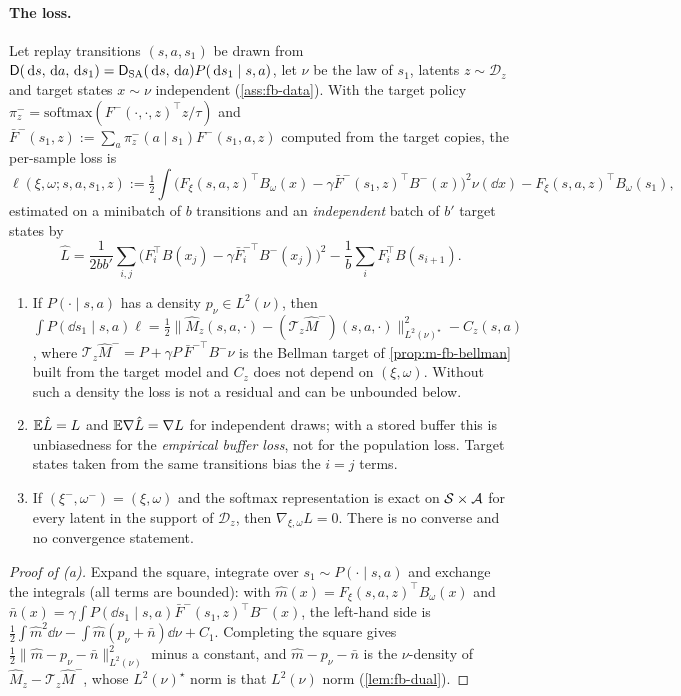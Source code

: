 \paragraph{The loss.}
Let replay transitions $(s,a,s_1)$ be drawn from $\mathsf D(\,\mathrm{d} s,\,\mathrm{d} a,\,\mathrm{d} s_1)=\mathsf D_{\mathrm{SA}}(\,\mathrm{d} s,\,\mathrm{d} a)P(\,\mathrm{d} s_1\mid s,a)$, let $\nu$ be the law of $s_1$, latents $z\sim\mathcal D_z$ and target states $x\sim\nu$ independent (\cref{ass:fb-data}). With the target policy $\pi^-_z=\mathrm{softmax}(F^-(\cdot,\cdot,z)^\top z/\tau)$ and $\bar F^-(s_1,z):=\sum_a\pi^-_z(a\mid s_1)F^-(s_1,a,z)$ computed from the target copies, the per-sample loss is
\begin{equation}\label{eq:m-fb-loss}
\ell(\xi,\omega;s,a,s_1,z):=\tfrac12\int\big(F_\xi(s,a,z)^\top B_\omega(x)-\gamma\bar F^-(s_1,z)^\top B^-(x)\big)^2\nu(\dd x)-F_\xi(s,a,z)^\top B_\omega(s_1),
\end{equation}
estimated on a minibatch of $b$ transitions and an \emph{independent} batch of $b'$ target states by
\[
\hat L=\frac1{2bb'}\sum_{i,j}\big(F_i^\top B(x_j)-\gamma\bar F^{-\top}_iB^-(x_j)\big)^2-\frac1b\sum_iF_i^\top B(s_{i+1}).
\]

\begin{proposition}\label{prop:m-fb-loss}
\begin{enumerate}[nosep,label=(\alph*)]
\item If $P(\cdot\mid s,a)$ has a density $p_\nu\in L^2(\nu)$, then $\int P(\dd s_1\mid s,a)\ell=\frac12\lVert\hat M_z(s,a,\cdot)-(\mathcal T_z\hat M^-)(s,a,\cdot)\rVert^2_{L^2(\nu)^\star}-C_z(s,a)$, where $\mathcal T_z\hat M^-=P+\gamma P\,\bar F^{-\top}B^-\nu$ is the Bellman target of \cref{prop:m-fb-bellman} built from the target model and $C_z$ does not depend on $(\xi,\omega)$. Without such a density the loss is not a residual and can be unbounded below.
\item $\mathbb{E}\hat L=L$ and $\mathbb{E}\nabla\hat L=\nabla L$ for independent draws; with a stored buffer this is unbiasedness for the \emph{empirical buffer loss}, not for the population loss. Target states taken from the same transitions bias the $i=j$ terms.
\item If $(\xi^-,\omega^-)=(\xi,\omega)$ and the softmax representation is exact on $\mathcal{S}\times\mathcal{A}$ for every latent in the support of $\mathcal D_z$, then $\nabla_{\xi,\omega}L=0$. There is no converse and no convergence statement.
\end{enumerate}
\end{proposition}
\begin{proof}[Proof of (a)]
Expand the square, integrate over $s_1\sim P(\cdot\mid s,a)$ and exchange the integrals (all terms are bounded): with $\hat m(x)=F_\xi(s,a,z)^\top B_\omega(x)$ and $\bar n(x)=\gamma\int P(\dd s_1\mid s,a)\bar F^-(s_1,z)^\top B^-(x)$, the left-hand side is $\frac12\int\hat m^2\dd\nu-\int\hat m(p_\nu+\bar n)\dd\nu+C_1$. Completing the square gives $\frac12\lVert\hat m-p_\nu-\bar n\rVert^2_{L^2(\nu)}$ minus a constant, and $\hat m-p_\nu-\bar n$ is the $\nu$-density of $\hat M_z-\mathcal T_z\hat M^-$, whose $L^2(\nu)^\star$ norm is that $L^2(\nu)$ norm (\cref{lem:fb-dual}).
\end{proof}

